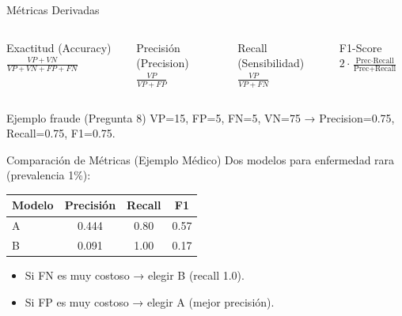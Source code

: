 \documentclass[aspectratio=169, 10pt, xcolor=table]{beamer}
\begin{document}
\begin{frame}{Métricas Derivadas}
    \begin{columns}[t]
        \begin{block}{Exactitud (Accuracy)}
            $\frac{VP+VN}{VP+VN+FP+FN}$
        \end{block}
        \begin{block}{Precisión (Precision)}
            $\frac{VP}{VP+FP}$
        \end{block}
        \begin{block}{Recall (Sensibilidad)}
            $\frac{VP}{VP+FN}$
        \end{block}
        \begin{block}{F1-Score}
            $2 \cdot \frac{\text{Prec} \cdot \text{Recall}}{\text{Prec} + \text{Recall}}$
        \end{block}
    \end{columns}
    \vspace{0.3cm}
    \begin{exampleblock}{Ejemplo fraude (Pregunta 8)}
        VP=15, FP=5, FN=5, VN=75 → Precision=0.75, Recall=0.75, F1=0.75.
    \end{exampleblock}
\end{frame}

\begin{frame}{Comparación de Métricas (Ejemplo Médico)}
    Dos modelos para enfermedad rara (prevalencia 1\%):
    \begin{table}
        \centering
        \begin{tabular}{l|c|c|c}
            \textbf{Modelo} & \textbf{Precisión} & \textbf{Recall} & \textbf{F1} \\
            \hline
            A & 0.444 & 0.80 & 0.57 \\
            B & 0.091 & 1.00 & 0.17 \\
        \end{tabular}
    \end{table}
    \begin{itemize}
        \item Si FN es muy costoso → elegir B (recall 1.0).
        \item Si FP es muy costoso → elegir A (mejor precisión).
    \end{itemize}
\end{frame}
\end{document}
